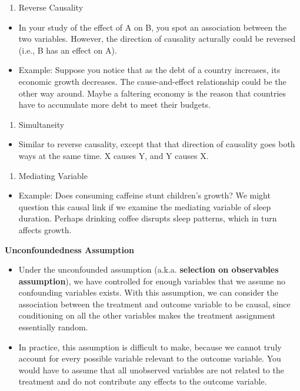 \documentclass[]{book}
\providecommand{\tightlist}{%
  \setlength{\itemsep}{0pt}\setlength{\parskip}{0pt}}
\begin{document}
\begin{enumerate}
\def\labelenumi{\arabic{enumi}.}
\setcounter{enumi}{1}
\tightlist
\item
  Reverse Causality
\end{enumerate}

\begin{itemize}
\tightlist
\item
  In your study of the effect of A on B, you spot an association between the two variables. However, the direction of causality acturally could be reversed (i.e., B has an effect on A).
\item
  Example: Suppose you notice that as the debt of a country increases, its economic growth decreases. The cause-and-effect relationship could be the other way around. Maybe a faltering economy is the reason that countries have to accumulate more debt to meet their budgets.
\end{itemize}

\begin{enumerate}
\def\labelenumi{\arabic{enumi}.}
\setcounter{enumi}{2}
\tightlist
\item
  Simultaneity
\end{enumerate}

\begin{itemize}
\tightlist
\item
  Similar to reverse causality, except that that direction of causality goes both ways at the same time. X causes Y, and Y causes X.
\end{itemize}

\begin{enumerate}
\def\labelenumi{\arabic{enumi}.}
\setcounter{enumi}{3}
\tightlist
\item
  Mediating Variable
\end{enumerate}

\begin{itemize}
\tightlist
\item
  Example: Does consuming caffeine stunt children's growth? We might question this causal link if we examine the mediating variable of sleep duration. Perhaps drinking coffee disrupts sleep patterns, which in turn affects growth.
\end{itemize}

\textbf{Unconfoundedness Assumption}

\begin{itemize}
\item
  Under the unconfounded assumption (a.k.a. \textbf{selection on observables assumption}), we have controlled for enough variables that we assume no confounding variables exists. With this assumption, we can consider the association between the treatment and outcome variable to be causal, since conditioning on all the other variables makes the treatment assignment essentially random.
\item
  In practice, this assumption is difficult to make, because we cannot truly account for every possible variable relevant to the outcome variable. You would have to assume that all unobserved variables are not related to the treatment and do not contribute any effects to the outcome variable.
\end{itemize}
\end{document}
